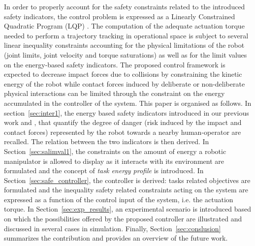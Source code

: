 \documentclass[letterpaper, 10 pt, conference]{ieeeconf}      %
\begin{document}
In order to properly account for the safety constraints related to the introduced safety indicators, the control problem is expressed as a Linearly Constrained Quadratic Program (LQP) \cite{boyd2004}. The computation of the adequate actuation torque needed to perform a trajectory tracking in operational space is subject to several linear inequality constraints accounting for the physical limitations of the robot (joint limits, joint velocity and torque saturations) as well as for the limit values on the energy-based safety indicators. The proposed control framework is expected to decrease impact forces due to collisions by constraining the kinetic energy of the robot while contact forces induced by deliberate or non-deliberate physical interactions can be limited through the constraint on the energy accumulated in the controller of the system. 
This paper is organised as follows. In section~\ref{sec:inter1}, the energy based safety indicators introduced in our previous work \cite{meguenani2015control} and \cite{meguenani2016energy}, that quantify the degree of danger (risk induced by the impact and contact forces) represented by the robot towards a nearby human-operator are recalled. The relation between the two indicators is then derived. In Section~\ref{sec:salimval1}, the constraints on the amount of energy  a robotic manipulator is allowed to display as it interacts with its environment are formulated and the concept of \textit{task energy profile} is introduced. In Section~\ref{sec:safe_controller}, the controller is derived: tasks related objectives are formulated and the inequality safety related constraints acting on the system are expressed as a function of the control input of the system, i.e. the actuation torque. In Section~\ref{sec:exp_results}, an experimental scenario is introduced based on which the possibilities offered by the proposed controller are illustrated and discussed in several cases in simulation. Finally, Section~\ref{sec:conslusion} summarizes the contribution and provides an overview of the future work.
\end{document}
